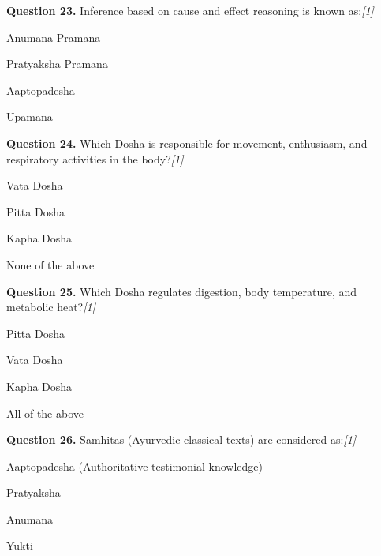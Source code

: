 \documentclass[11pt,a4paper]{article}
\newcommand{\pts}[1]{\hfill   \textit{[#1]}}
\begin{document}
\medskip




\noindent   \textbf{Question 23.} Inference based on cause and effect reasoning is known as:\pts{1}

\begin{parts}
  \item Anumana Pramana
  \item Pratyaksha Pramana
  \item Aaptopadesha
  \item Upamana
\end{parts}

\medskip




\noindent   \textbf{Question 24.} Which Dosha is responsible for movement, enthusiasm, and respiratory activities in the body?\pts{1}

\begin{parts}
  \item Vata Dosha
  \item Pitta Dosha
  \item Kapha Dosha
  \item None of the above
\end{parts}

\medskip




\noindent   \textbf{Question 25.} Which Dosha regulates digestion, body temperature, and metabolic heat?\pts{1}

\begin{parts}
  \item Pitta Dosha
  \item Vata Dosha
  \item Kapha Dosha
  \item All of the above
\end{parts}

\medskip




\noindent   \textbf{Question 26.} Samhitas (Ayurvedic classical texts) are considered as:\pts{1}

\begin{parts}
  \item Aaptopadesha (Authoritative testimonial knowledge)
  \item Pratyaksha
  \item Anumana
  \item Yukti
\end{parts}

\medskip
\end{document}

